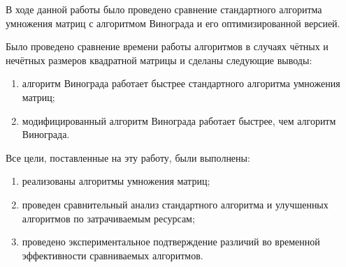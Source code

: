 \Conclusion

В ходе данной работы было проведено сравнение стандартного алгоритма умножения матриц с алгоритмом Винограда и его оптимизированной версией.

Было проведено сравнение времени работы алгоритмов в случаях чётных и нечётных размеров квадратной матрицы и сделаны
следующие выводы:
\begin{enumerate}
    \item алгоритм Винограда работает быстрее стандартного алгоритма умножения матриц;
    \item модифицированный алгоритм Винограда работает быстрее, чем алгоритм Винограда.
\end{enumerate}

Все цели, поставленные на эту работу, были выполнены:
\begin{enumerate}
    \item реализованы алгоритмы умножения матриц;
    \item проведен сравнительный анализ стандартного алгоритма и улучшенных алгоритмов по затрачиваемым ресурсам;
    \item проведено экспериментальное подтверждение различий во временной эффективности сравниваемых алгоритмов.
\end{enumerate}

